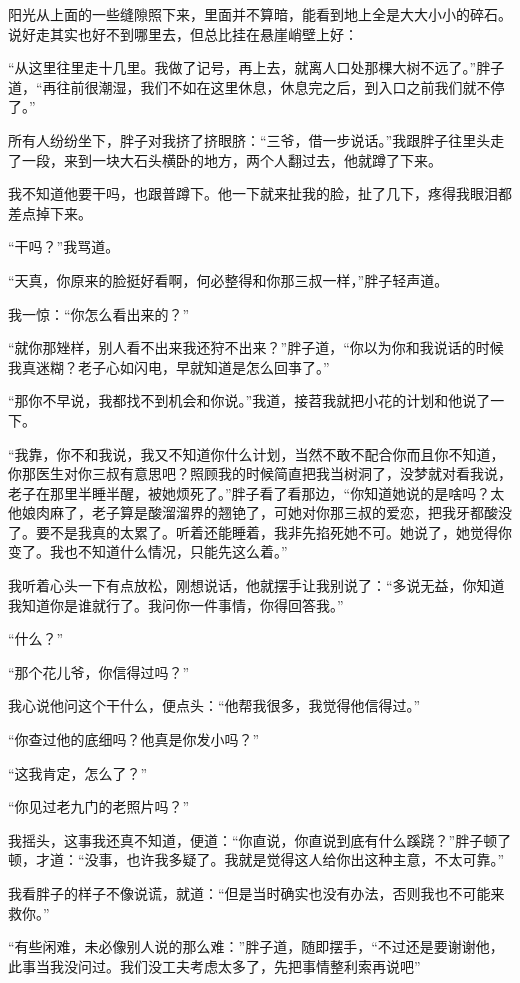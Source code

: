 阳光从上面的一些缝隙照下来，里面并不算暗，能看到地上全是大大小小的碎石。说好走其实也好不到哪里去，但总比挂在悬崖峭壁上好：

“从这里往里走十几里。我做了记号，再上去，就离人口处那棵大树不远了。”胖子道，“再往前很潮湿，我们不如在这里休息，休息完之后，到入口之前我们就不停了。”

所有人纷纷坐下，胖子对我挤了挤眼脐：“三爷，借一步说话。”我跟胖子往里头走了一段，来到一块大石头横卧的地方，两个人翻过去，他就蹲了下来。

我不知道他要干吗，也跟普蹲下。他一下就来扯我的脸，扯了几下，疼得我眼泪都差点掉下来。

“干吗？”我骂道。

“天真，你原来的脸挺好看啊，何必整得和你那三叔一样，”胖子轻声道。

我一惊：“你怎么看出来的？”

“就你那矬样，别人看不出来我还狩不出来？”胖子道，“你以为你和我说话的时候我真迷糊？老子心如闪电，早就知道是怎么回亊了。”

“那你不早说，我都找不到机会和你说。”我道，接苕我就把小花的计划和他说了一下。

“我靠，你不和我说，我又不知道你什么计划，当然不敢不配合你而且你不知道，你那医生对你三叔有意思吧？照顾我的时候简直把我当树洞了，没梦就对看我说，老子在那里半睡半醒，被她烦死了。”胖子看了看那边，“你知道她说的是啥吗？太他娘肉麻了，老子算是酸溜溜界的翘铯了，可她对你那三叔的爱恋，把我牙都酸没了。要不是我真的太累了。听着还能睡着，我非先掐死她不可。她说了，她觉得你变了。我也不知道什么情况，只能先这么着。”

我听着心头一下有点放松，刚想说话，他就摆手让我别说了：“多说无益，你知道我知道你是谁就行了。我问你一件事情，你得回答我。”

“什么？”

“那个花儿爷，你信得过吗？”

我心说他问这个干什么，便点头：“他帮我很多，我觉得他信得过。”

“你查过他的底细吗？他真是你发小吗？”

“这我肯定，怎么了？”

“你见过老九门的老照片吗？”

我摇头，这事我还真不知道，便道：“你直说，你直说到底有什么蹊跷？”胖子顿了顿，才道：“没事，也许我多疑了。我就是觉得这人给你出这种主意，不太可靠。”

我看胖子的样子不像说谎，就道：“但是当时确实也没有办法，否则我也不可能来救你。”

“有些闲难，未必像别人说的那么难：”胖子道，随即摆手，“不过还是要谢谢他，此事当我没问过。我们没工夫考虑太多了，先把事情整利索再说吧”

